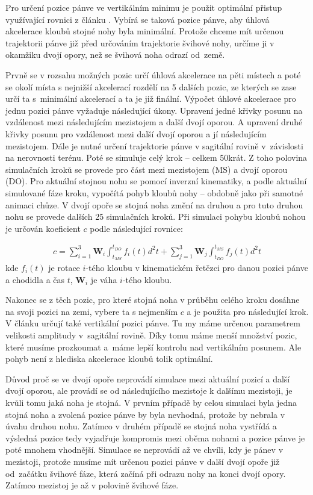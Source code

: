 Pro určení pozice pánve ve vertikálním minimu je použit optimální přistup využívající rovnici z článku \cite{chung}. Vybírá se taková pozice pánve, aby úhlová akce\-le\-ra\-ce kloubů stojné nohy byla minimální. Protože chceme mít určenou trajektorii pánve již před určová\-ním trajektorie švihové nohy, určíme ji v okamžiku dvojí opory, než se švihová noha odrazí od~země.

Prvně se v rozsahu možných pozic určí úhlová akcelerace na pěti místech a poté se okolí místa s nejnižší akcelerací rozdělí na 5 dalších pozic, ze kterých se zase určí ta s~minimální akcelerací a ta je již finální. Výpočet úhlové akcelerace pro jednu pozici pánve vyžaduje následující úkony. Upravení jedné křivky posunu na vzdálenost mezi následujícím mezistojem a další dvojí oporou. A upravení druhé křivky posunu pro vzdálenost mezi další dvojí oporou a jí následujícím mezistojem. Dále je nutné určení trajektorie pánve v sagitální rovině v~závislosti na nerovnosti terénu. Poté se simuluje celý krok -- celkem 50krát. Z toho polovina simulačních kroků se provede pro část mezi mezistojem (MS) a dvojí oporou (DO). Pro aktuální stojnou nohu se pomocí inverzní kinematiky, a podle aktuální simulované fáze kroku, vypočítá pohyb kloubů nohy -- obdobně jako při samotné animaci chůze. V dvojí opoře se stojná noha změní na druhou a pro tuto druhou nohu se provede dalších 25 simulačních kroků. Při simulaci pohybu kloubů nohou je určován koeficient $c$ podle následující rovnice:

\begin{eqnarray}
c = \sum_{i=1}^{3} \mathbf{W}_i \int_{t_{MS}}^{t_{DO}}f_i(t)d^2t + \sum_{j=1}^{3} \mathbf{W}_j \int_{t_{DO}}^{t_{MS}}f_j(t)d^2t 
\label{eq:coefficient}
\end{eqnarray}
kde $f_i(t)$ je rotace $i$-tého kloubu v kinematickém řetězci pro danou pozici pánve a chodidla a čas $t$, $\mathbf{W}_i$ je váha $i$-tého kloubu.

Nakonec se z těch pozic, pro které stojná noha v průběhu celého kroku dosáhne na svoji pozici na zemi, vybere ta s nejmenším $c$ a je použita pro následující krok. V článku \cite{chung} určují také vertikální pozici pánve. Tu my máme určenou parametrem velikosti amplitudy v~sagitální rovině. Díky tomu máme menší množství pozic, které musíme prozkoumat a~máme lepší kontrolu nad vertikálním posunem. Ale pohyb není z hlediska akcelerace kloubů tolik optimální.

Důvod proč se ve dvojí opoře neprovádí simulace mezi aktuální pozicí a další dvojí oporou, ale provádí se od následujícího mezistoje k dalšímu mezistoji, je kvůli tomu jaká noha je stojná. V prvním případě by celou simulaci byla jedna stojná noha a zvolená pozice pánve by byla nevhodná, protože by nebrala v úvahu druhou nohu. Zatímco v druhém případě se stojná noha vystřídá a výsledná pozice tedy vyjadřuje kompromis mezi oběma nohami a pozice pánve je poté mnohem vhodnější. Simulace se neprovádí až ve chvíli, kdy je pánev v mezistoji, protože musíme mít určenou pozici pánve v další dvojí opoře již od~začátku švihové fáze, která začíná při odrazu nohy na konci dvojí opory. Zatímco mezistoj je až v polovině švihové fáze.

